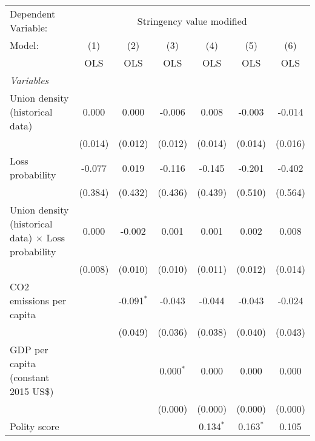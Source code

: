 
\begingroup
\centering
\begin{tabular}{lcccccc}
   \toprule
   Dependent Variable: & \multicolumn{6}{c}{Stringency value modified}\\
   Model:                                                     & (1)     & (2)          & (3)         & (4)         & (5)         & (6)\\  
                                                              &  OLS    & OLS          & OLS         & OLS         & OLS         & OLS\\  
   \midrule
   \emph{Variables}\\
   Union density (historical data)                            & 0.000   & 0.000        & -0.006      & 0.008       & -0.003      & -0.014\\   
                                                              & (0.014) & (0.012)      & (0.012)     & (0.014)     & (0.014)     & (0.016)\\   
   Loss probability                                           & -0.077  & 0.019        & -0.116      & -0.145      & -0.201      & -0.402\\   
                                                              & (0.384) & (0.432)      & (0.436)     & (0.439)     & (0.510)     & (0.564)\\   
   Union density (historical data) $\times$ Loss probability  & 0.000   & -0.002       & 0.001       & 0.001       & 0.002       & 0.008\\   
                                                              & (0.008) & (0.010)      & (0.010)     & (0.011)     & (0.012)     & (0.014)\\   
   CO2 emissions per capita                                   &         & -0.091$^{*}$ & -0.043      & -0.044      & -0.043      & -0.024\\   
                                                              &         & (0.049)      & (0.036)     & (0.038)     & (0.040)     & (0.043)\\   
   GDP per capita (constant 2015 US\$)                        &         &              & 0.000$^{*}$ & 0.000       & 0.000       & 0.000\\   
                                                              &         &              & (0.000)     & (0.000)     & (0.000)     & (0.000)\\   
   Polity score                                               &         &              &             & 0.134$^{*}$ & 0.163$^{*}$ & 0.105\\   

\end{tabular}
